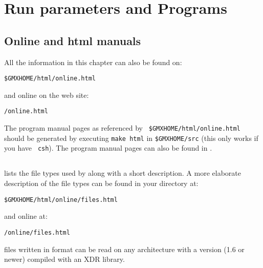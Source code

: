 %
% 
% 
% 
% 
% 
% 
% 
% 
%

\chapter{Run parameters and Programs}
\label{ch:programs}

\section{Online and html manuals}
All the information in this chapter can also be found on:\\
\centerline{\tt \$GMXHOME/html/online.html}
and online on the {\gromacs} web site:\\
\centerline{\tt \wwwpage/online\gmxver.html}
The program manual pages as referenced by {\tt
\$GMXHOME/html/online.html} should be generated by executing {\tt make
html} in {\tt \$GMXHOME/src} (this only works if you have {\tt
csh}). The program manual pages can also be found in
.

\section{}
\label{sec:fileformats}
 lists the file types used by {\gromacs} along with
a short description. A more elaborate description of the file types can
be found in your {\gromacs} directory at:\\
\centerline{\tt \$GMXHOME/html/online/files.html}
and online at:\\
\centerline{\tt {\wwwpage}/online\gmxver/files.html}

{\gromacs} files written in  format can be read on any
architecture with a {\gromacs} version (1.6 or newer) compiled with an
XDR library.


\section{}


